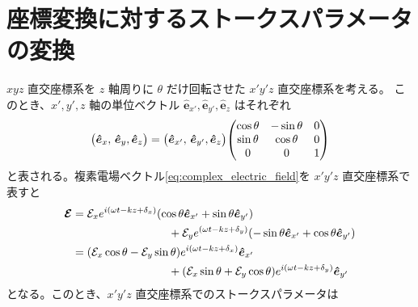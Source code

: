 \documentclass[../../main.tex]{subfiles}
\begin{document}
\section{座標変換に対するストークスパラメータの変換}
\label{sec:stokes_transform}
$xyz$ 直交座標系を $z$ 軸周りに $\theta$ だけ回転させた $x'y'z$ 直交座標系を考える。
このとき、$x',y',z$ 軸の単位ベクトル $\bm{\hat{e}}_{x'},\bm{\hat{e}}_{y'},\bm{\hat{e}}_{z}$ はそれぞれ
\begin{equation}
    \mqty(\bm{\hat{e}}_{x},\,\bm{\hat{e}}_{y},\bm{\hat{e}}_{z}) = 
        \mqty(\bm{\hat{e}}_{x'},\,\bm{\hat{e}}_{y'},\bm{\hat{e}}_{z})
        \mqty(\cos\theta & -\sin\theta & 0 \\
              \sin\theta & \cos\theta & 0 \\
              0 & 0 & 1
              )
\end{equation}
と表される。複素電場ベクトル\eqref{eq:complex_electric_field}を $x'y'z$ 直交座標系で表すと
\begin{align}
    \bm{\mathcal{E}} &= \mathcal{E}_{x}e^{i\qty(\omega t-kz+\delta_x)}\qty(\cos\theta \bm{\hat{e}}_{x'} + \sin\theta \bm{\hat{e}}_{y'}) \notag \\
        &\hspace{3cm} + \mathcal{E}_{y}e^{\qty(\omega t-kz+\delta_y)}(-\sin\theta \bm{\hat{e}}_{x'} + \cos\theta\bm{\hat{e}}_{y'}) \\
    &= \qty(\mathcal{E}_{x}\cos\theta - \mathcal{E}_{y}\sin\theta)e^{i\qty(\omega t-kz+\delta_x)}\bm{\hat{e}}_{x'} \notag \\
        &\hspace{3cm} + \qty(\mathcal{E}_{x}\sin\theta + \mathcal{E}_{y}\cos\theta)e^{i\qty(\omega t-kz+\delta_y)}\bm{\hat{e}}_{y'}
\end{align}
となる。このとき、$x'y'z$ 直交座標系でのストークスパラメータは
\end{document}
